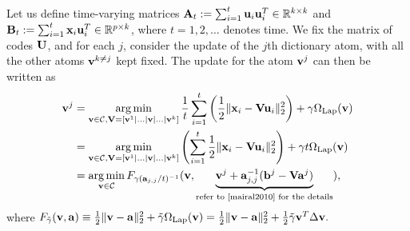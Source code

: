 Let us define time-varying matrices $\mathbf{A}_t := \sum_{i=1}^t\mathbf{u}_i\mathbf{u}_i^T \in \mathbb R^{k \times k}$ and $\mathbf{B}_t := \sum_{i=1}^t\mathbf{x}_i\mathbf{u}_i^T \in \mathbb R^{p \times k}$, where $t=1,2,\ldots$ denotes time. We fix the matrix of codes $\mathbf{U}$, and for each $j$, consider the update of the $j$th dictionary atom, with all the other atoms $\mathbf{v}^{k\ne j}$
kept fixed. The update for the atom $\mathbf{v}^j$ can then be written as
\begin{eqnarray}
  \label{eq:qp}
\begin{split}
  \mathbf{v}^j &= \operatorname*{arg\,min}_{\mathbf{v} \in \mathcal C,
    \mathbf{V}=[\mathbf{v}^1|\ldots|\mathbf{v}|\ldots|\mathbf{v}^k]}\frac{1}{t}\sum_{i=1}^t\left(\frac{1}{2}\|\mathbf{x}_i
  -\mathbf{V}\mathbf{u}_i\|_{2}^2\right) + \gamma\Omega_{\text{Lap}}(\mathbf{v})\\
  &=\operatorname*{arg\,min}_{\mathbf{v} \in \mathcal C,
    \mathbf{V}=[\mathbf{v}^1|\ldots|\mathbf{v}|\ldots|\mathbf{v}^k]}\left(\sum_{i=1}^t\frac{1}{2}\|\mathbf{x}_i -\mathbf{V}\mathbf{u}_i\|_{2}^2\right)
  + \gamma t\Omega_{\text{Lap}}(\mathbf{v})\\
  &=\operatorname*{arg\,min}_{\mathbf{v} \in \mathcal C}F_{\gamma (\mathbf{a}_{j,j}/t)^{-1}}(\mathbf{v}, \underbrace{\mathbf{v}^j + \mathbf{a}_{j,j}^{-1}(\mathbf{b}^j - \mathbf{V}\mathbf{a}^j)}_{\text{refer to  \cite{mairal2010} for the details}}),
\end{split}
\end{eqnarray}
where
$F_{\tilde{\gamma}}(\mathbf{v},\mathbf{a}) \equiv \frac{1}{2}\|\mathbf{v} - \mathbf{a}\|_2^2
  + \tilde{\gamma}\Omega_{\text{Lap}}(\mathbf{v}) = \frac{1}{2}\|\mathbf{v} - \mathbf{a}\|_2^2
  + \frac{1}{2}\tilde{\gamma}\mathbf{v}^T\Delta\mathbf{v}.
$

